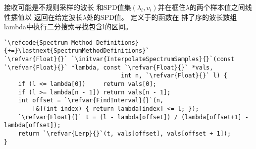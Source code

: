 接收可能是不规则采样的波长
和SPD值集$(\lambda_i,v_i)$并在框住$\lambda$的两个样本值之间线性插值以
返回在给定波长$\lambda$处的SPD值。
定义于的函数在
排了序的波长数组{\ttfamily lambda}中执行二分搜索寻找包含{\ttfamily l}的区间。
\begin{lstlisting}
`\refcode{Spectrum Method Definitions}{+=}\lastnext{SpectrumMethodDefinitions}`
`\refvar{Float}{}` `\initvar{InterpolateSpectrumSamples}{}`(const `\refvar{Float}{}` *lambda, const `\refvar{Float}{}` *vals,
                                 int n, `\refvar{Float}{}` l) {
    if (l <= lambda[0])     return vals[0];
    if (l >= lambda[n - 1]) return vals[n - 1];
    int offset = `\refvar{FindInterval}{}`(n,
        [&](int index) { return lambda[index] <= l; });
    `\refvar{Float}{}` t = (l - lambda[offset]) / (lambda[offset+1] - lambda[offset]);
    return `\refvar{Lerp}{}`(t, vals[offset], vals[offset + 1]);
}
\end{lstlisting}